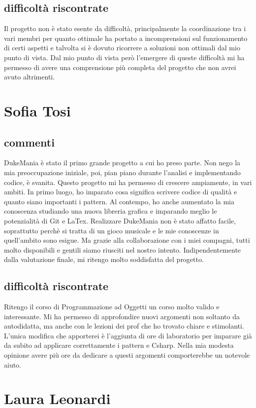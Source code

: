 \documentclass[a4paper,12pt]{report}
\begin{document}
\subsection{difficoltà riscontrate}
Il progetto non è stato esente da difficoltà, principalmente la coordinazione tra i vari membri per quanto ottimale ha portato a incomprensioni sul funzionamento di certi aspetti e talvolta si è dovuto ricorrere a soluzioni non ottimali dal mio punto di vista. Dal mio punto di vista però l'emergere di queste difficoltà mi ha permesso di avere una comprensione più completa del progetto che non avrei avuto altrimenti.
\newpage
\section{Sofia Tosi}
\subsection{commenti}
DukeMania è stato il primo grande progetto a cui ho preso parte. 
Non nego la mia preoccupazione iniziale, poi, pian piano durante l'analisi e implementando codice, è svanita.
Questo progetto mi ha permesso di crescere ampiamente, in vari ambiti.
In primo luogo, ho imparato cosa significa scrivere codice di qualità e quanto siano importanti i pattern.
Al contempo, ho anche aumentato la mia conoscenza studiando una nuova libreria grafica e imparando meglio le potenzialità di Git e LaTex. 
Realizzare DukeMania non è stato affatto facile, soprattutto perchè si tratta di un gioco musicale e le mie conoscenze in quell'ambito
sono esigue. Ma grazie alla collaborazione con i miei compagni, tutti molto disponibili e gentili siamo riusciti nel nostro intento.
Indipendentemente dalla valutazione finale, mi ritengo molto soddisfatta del progetto.
\subsection{difficoltà riscontrate}
Ritengo il corso di Programmazione ad Oggetti un corso molto valido e interessante. 
Mi ha permesso di approfondire nuovi argomenti non soltanto da autodidatta, ma anche con le lezioni dei prof 
che ho trovato chiare e stimolanti. L'unica modifica che apporterei è l'aggiunta di ore di laboratorio per
imparare già da subito ad applicare correttamente i pattern e Csharp. Nella mia modesta opinione avere più ore da dedicare a questi argomenti
comporterebbe un notevole aiuto.
\newpage
\section{Laura Leonardi}
\end{document}
